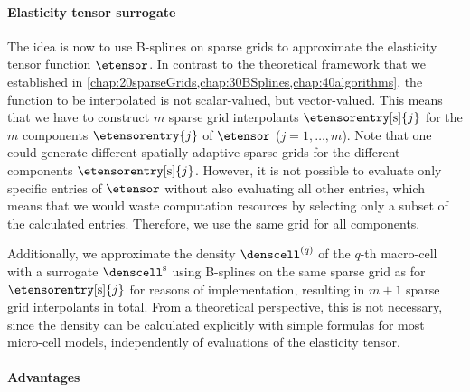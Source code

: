 \paragraph{Elasticity tensor surrogate}

The idea is now to use B-splines on sparse grids to approximate
the elasticity tensor function $\etensor$.
In contrast to the theoretical framework that we established in
\cref{chap:20sparseGrids,chap:30BSplines,chap:40algorithms},
the function to be interpolated is not scalar-valued, but vector-valued.
This means that we have to construct $m$ sparse grid interpolants
$\etensorentry[\sparse]{j}$
for the $m$ components $\etensorentry{j}$ of $\etensor$ ($j = 1, \dotsc, m$).
Note that one could generate different spatially adaptive sparse grids for the
different components $\etensorentry[\sparse]{j}$.
However, it is not possible to evaluate only specific entries of $\etensor$
without also evaluating all other entries,
which means that we would waste computation resources by selecting only
a subset of the calculated entries.
Therefore, we use the same grid for all components.

Additionally, we approximate the density $\denscell^{(q)}$
of the $q$-th macro-cell with a surrogate $\denscell^{\sparse}$ using
B-splines on the same sparse grid as for $\etensorentry[\sparse]{j}$
for reasons of implementation,
resulting in $m + 1$ sparse grid interpolants in total.
From a theoretical perspective, this is not necessary,
since the density can be calculated explicitly with simple formulas
for most micro-cell models, independently of evaluations of the
elasticity tensor.

\paragraph{Advantages}

